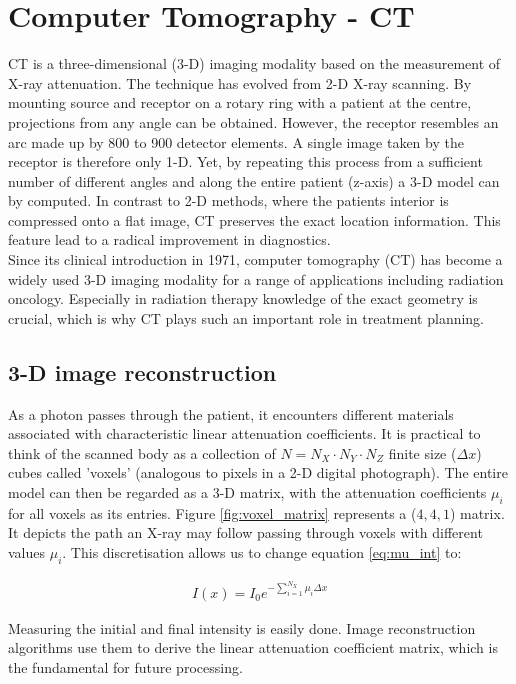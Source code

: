 \section{Computer Tomography - CT}
CT is a three-dimensional (3-D) imaging modality based on the measurement of X-ray attenuation.
The technique has evolved from 2-D X-ray scanning.
By mounting source and receptor on a rotary ring with a patient at the centre, projections from any angle can be obtained.
However, the receptor resembles an arc made up by 800 to 900 detector elements.
A single image taken by the receptor is therefore only 1-D. Yet, by repeating this process from a sufficient number of different angles and along the entire patient (z-axis) a 3-D model can by computed.
In contrast to 2-D methods, where the patients interior is compressed onto a flat image, CT preserves the exact location information. This feature lead to a radical improvement in diagnostics.	 \\

Since its clinical introduction in 1971, computer tomography (CT) has become a widely used 3-D imaging modality for a range of applications including radiation oncology. Especially in radiation therapy knowledge of the exact geometry is crucial, which is why CT plays such an important role in treatment planning.

\subsection{3-D image reconstruction}
As a photon passes through the patient, it encounters different materials associated with characteristic linear attenuation coefficients.
It is practical to think of the scanned body as a collection of $N = N_X\cdot N_Y\cdot N_Z$ finite size ($\Delta x$) cubes called 'voxels' (analogous to pixels in a 2-D digital photograph).
The entire model can then be regarded as a 3-D matrix, with the attenuation coefficients $\mu_i$ for all voxels as its entries.
Figure \ref{fig:voxel_matrix} represents a ($4, 4, 1$) matrix.
It depicts the path an X-ray may follow passing through voxels with different values $\mu_i$.
This discretisation allows us to change equation \ref{eq:mu_int} to:


\begin{align}
\label{eq:mu_sum}
I(x) = I_0 e^{- \sum\limits_{i=1}^{N_X} \mu_i \Delta x}
\end{align}

Measuring the initial and final intensity is easily done. Image reconstruction algorithms use them to derive the linear attenuation coefficient matrix, which is the fundamental for future processing.

